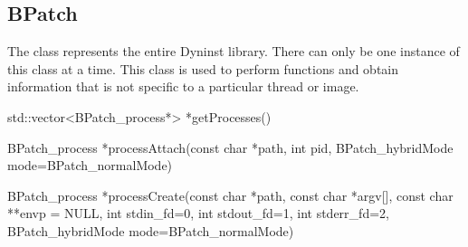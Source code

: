 \subsection{BPatch}

The  class represents the entire Dyninst library. There can only be one instance
of this class at a time. This class is used to perform functions and obtain information that
is not specific to a particular thread or image.

\begin{apient}
std::vector<BPatch_process*> *getProcesses()

\end{apient}

\begin{apient}
BPatch_process *processAttach(const char *path, int pid, BPatch_hybridMode mode=BPatch_normalMode)

BPatch_process *processCreate(const char *path, const char *argv[], const char **envp = NULL,
                              int stdin_fd=0, int stdout_fd=1, int stderr_fd=2,
                              BPatch_hybridMode mode=BPatch_normalMode)
\end{apient}

